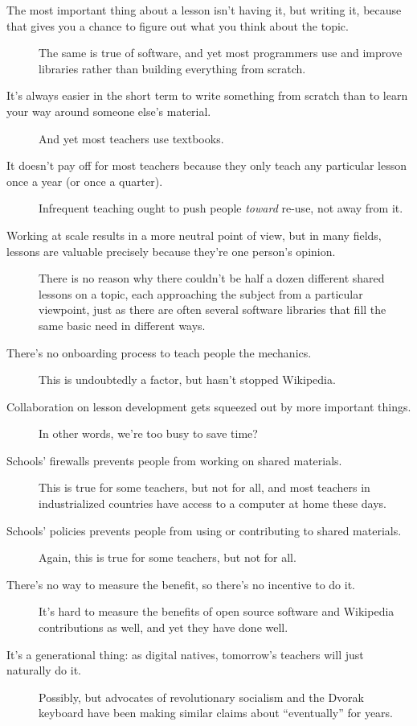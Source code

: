 \begin{description}

\item[The most important thing about a lesson isn't having it, but
  writing it, because that gives you a chance to figure out what you
  think about the topic.] The same is true of software, and yet most
  programmers use and improve libraries rather than building
  everything from scratch.
  
\item[It's always easier in the short term to write something from
  scratch than to learn your way around someone else's material.]  And
  yet most teachers use textbooks.
    
\item[It doesn't pay off for most teachers because they only teach any
  particular lesson once a year (or once a quarter).]  Infrequent
  teaching ought to push people \emph{toward} re-use, not away from
  it.

\item[Working at scale results in a more neutral point of view, but in
  many fields, lessons are valuable precisely because they're one
  person's opinion.]  There is no reason why there couldn't be half a
  dozen different shared lessons on a topic, each approaching the
  subject from a particular viewpoint, just as there are often several
  software libraries that fill the same basic need in different ways.

\item[There's no onboarding process to teach people the mechanics.]
  This is undoubtedly a factor, but hasn't stopped Wikipedia.

\item[Collaboration on lesson development gets squeezed out by more
  important things.]  In other words, we're too busy to save time?

\item[Schools' firewalls prevents people from working on shared
  materials.] This is true for some teachers, but not for all, and
  most teachers in industrialized countries have access to a computer
  at home these days.

\item[Schools' policies prevents people from using or contributing to
  shared materials.]  Again, this is true for some teachers, but not
  for all.

\item[There's no way to measure the benefit, so there's no incentive
  to do it.] It's hard to measure the benefits of open source software
  and Wikipedia contributions as well, and yet they have done well.

\item[It's a generational thing: as digital natives, tomorrow's
  teachers will just naturally do it.]  Possibly, but advocates of
  revolutionary socialism and the Dvorak keyboard have been making
  similar claims about ``eventually'' for years.

\end{description}

